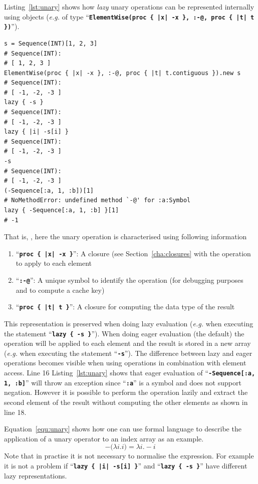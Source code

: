 \documentclass[12pt,a4paper,oneside,openright]{book}
\newcommand{\eg}{\emph{e.g.} }
\newcommand{\Eg}{For ex\-am\-ple }
\newcommand{\Ie}{That is, }
\newcommand{\sct}[1]{Section~\ref{cha:#1}}
\newcommand{\equ}[1]{Equation~\ref{equ:#1}}
\newcommand{\lst}[1]{Listing~\ref{lst:#1}}
\newcommand{\code}[1]{``\texttt{\textbf{\textcolor{codegray}{\small{#1}}}}''}
\begin{document}
\begin{CJK}{UTF8}{}
\lst{unary} shows how \emph{lazy} unary operations can be represented internally using objects (\eg of type \code{ElementWise(proc \{ |x| -x \}, :-@, proc \{ |t| t \})}).
\lstset{language=Ruby,frame=single,numbers=left}
\begin{lstlisting}[float=htbp,caption={Internal representation of unary operations},escapechar=\$,label=lst:unary]
s = Sequence(INT)[1, 2, 3]
# Sequence(INT):
# [ 1, 2, 3 ]
ElementWise(proc { |x| -x }, :-@, proc { |t| t.contiguous }).new s
# Sequence(INT):
# [ -1, -2, -3 ]
lazy { -s }
# Sequence(INT):
# [ -1, -2, -3 ]
lazy { |i| -s[i] }
# Sequence(INT):
# [ -1, -2, -3 ]
-s
# Sequence(INT):
# [ -1, -2, -3 ]
(-Sequence[:a, 1, :b])[1]
# NoMethodError: undefined method `-@' for :a:Symbol
lazy { -Sequence[:a, 1, :b] }[1]
# -1
\end{lstlisting}
\Ie, here the unary operation is characterised using following information
\begin{enumerate}
\item \code{proc \{ |x| -x \}}: A closure (see \sct{closures} with the operation to apply to each element
\item \code{:-@}: A unique symbol to identify the operation (for debugging purposes and to compute a cache key)
\item \code{proc \{ |t| t \}}: A closure for computing the data type of the result
\end{enumerate}
This representation is preserved when doing lazy evaluation (\eg when executing the statement \code{lazy \{ -s \}}).
When doing eager evaluation (the default) the operation will be applied to each element and the result is stored in a new array (\eg when executing the statement \code{-s}).
The difference between lazy and eager operations becomes visible when using operations in combination with element access. Line 16 \lst{unary} shows that eager evaluation of \code{-Sequence[:a, 1, :b]} will throw an exception since \code{:a} is a symbol and does not support negation. However it is possible to perform the operation lazily and extract the second element of the result without computing the other elements as shown in line 18.

\equ{unary} shows how one can use formal language to describe the application of a unary operator to an index array as an example.
\begin{equation}\label{equ:unary}
  -\big(\lambda i.i\big)=\lambda i.-i
\end{equation}
Note that in practise it is not necessary to normalise the expression. \Eg it is not a problem if \code{lazy \{ |i| -s[i] \}} and \code{lazy \{ -s \}} have different lazy representations.


\end{CJK}
\end{document}
